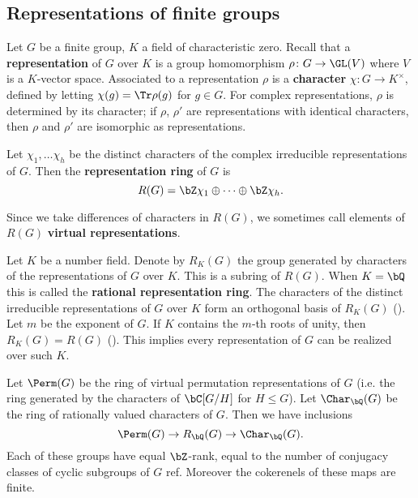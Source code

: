 \subsection{Representations of finite groups}\label{rep}

Let $G$ be a finite group, $K$ a field of characteristic zero. Recall that a \textbf{representation} of $G$ over $K$ is a group homomorphism $\rho \colon G \to \GL(V)$ where $V$ is a $K$-vector space. Associated to a representation $\rho$ is a \textbf{character} $\chi \colon G \to K^{\times}$, defined by letting $\chi(g) = \Tr \rho(g)$ for $g \in G$. For complex representations, $\rho$ is determined by its character; if $\rho$, $\rho'$ are representations with identical characters, then $\rho$ and $\rho'$ are isomorphic as representations. 

\begin{defn}
Let $\chi_1, \ldots \chi_h$ be the distinct characters of the complex irreducible representations of $G$. 
Then the \textbf{representation ring} of $G$ is 
\[ R(G) = \bZ \chi_1 \oplus \cdots \oplus \bZ \chi_h .\]
\end{defn}

Since we take differences of characters in $R(G)$, we sometimes call elements of $R(G)$ \textbf{virtual representations}. 

Let $K$ be a number field. Denote by $R_K(G)$ the group generated by characters of the representations of $G$ over $K$. This is a subring of $R(G)$.
When $K = \bQ$ this is called the \textbf{rational representation ring}.
The characters of the distinct irreducible representations of $G$ over $K$ form an orthogonal basis of $R_K(G)$ (\cite[Proposition 32]{Serre}).
Let $m$ be the exponent of $G$. If $K$ contains the $m$-th roots of unity, then $R_K(G) = R(G)$ (\cite[Theorem 24]{Serre}). This implies every representation of $G$ can be realized over such $K$. 
\vspace{1em}

Let $\Perm(G)$ be the ring of virtual permutation representations of $G$ (i.e. the ring generated by the characters of $\bC[G / H]$ for $H \leq G$). Let $\Char_{\bQ}(G)$ be the ring of rationally valued characters of $G$. Then we have inclusions 
\[ \Perm(G) \to R_{\bQ}(G) \to \Char_{\bQ}(G). \]
Each of these groups have equal $\bZ$-rank, equal to the number of conjugacy classes of cyclic subgroups of $G$ {\color{red} ref}. Moreover the cokerenels of these maps are finite.

